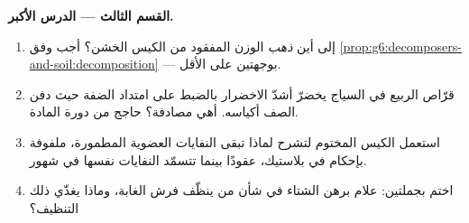 \begin{problem}
\medskip\noindent\textbf{القسم الثالث --- الدرس الأكبر.}
\begin{enumerate}[resume]
  \item إلى أين \emph{ذهب} الوزن المفقود من الكيس الخشن؟ أجب وفق
        \cref{prop:g6:decomposers-and-soil:decomposition} ---
        بوجهتين على الأقل.
  \item قرّاص الربيع في السياج يخضرّ أشدّ الاخضرار بالضبط على
        امتداد الضفة حيث دفن الصف أكياسه. أهي مصادفة؟ حاجج من
        دورة المادة.
  \item استعمل الكيس المختوم لتشرح لماذا تبقى النفايات العضوية
        المطمورة، ملفوفة بإحكام في بلاستيك، عقودًا بينما تتسمّد
        النفايات نفسها في شهور.
  \item اختم بجملتين: علام برهن الشتاء في شأن من ينظّف فرش
        الغابة، وماذا يغذّي ذلك التنظيف؟
\end{enumerate}
\end{problem}
